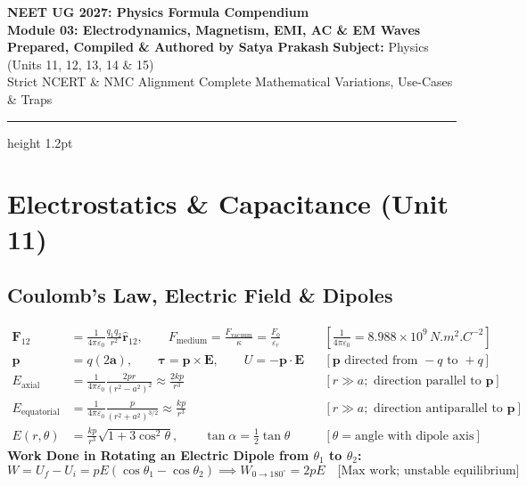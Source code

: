 \documentclass[11pt,a4paper]{article}
\begin{document}
\begin{center}
  {\huge\bfseries\color{primarydark} NEET UG 2027: Physics Formula Compendium}\\[6pt]
  {\Large\bfseries\color{accentblue} Module 03: Electrodynamics, Magnetism, EMI, AC \& EM Waves}\\[8pt]
  {\normalsize\textbf{Prepared, Compiled \& Authored by Satya Prakash} \quad\textbar\quad \textbf{Subject:} Physics (Units 11, 12, 13, 14 \& 15)}\\[4pt]
  {\footnotesize\color{gray} Strict NCERT \& NMC Alignment \quad\textbar\quad Complete Mathematical Variations, Use-Cases \& Traps}
\end{center}
\vspace{-2pt}
\hrule height 1.2pt
\vspace{8pt}

\section{Electrostatics \& Capacitance (Unit 11)}

\subsection{Coulomb's Law, Electric Field \& Dipoles}

\begin{formulabox}
\begin{align}
  \mathbf{F}_{12} &= \frac{1}{4\pi\varepsilon_0}\frac{q_1 q_2}{r^2}\hat{\mathbf{r}}_{12}, \qquad F_{\text{medium}} = \frac{F_{\text{vacuum}}}{\kappa} = \frac{F_0}{\varepsilon_r} && \left[\frac{1}{4\pi\varepsilon_0} = 8.988\times 10^9\,\si{N.m^2.C^{-2}}\right] \\
  \mathbf{p} &= q(2\mathbf{a}), \qquad \boldsymbol{\tau} = \mathbf{p}\times\mathbf{E}, \qquad U = -\mathbf{p}\cdot\mathbf{E} && [\mathbf{p} \text{ directed from } -q \text{ to } +q] \\
  E_{\text{axial}} &= \frac{1}{4\pi\varepsilon_0}\frac{2pr}{(r^2-a^2)^2} \approx \frac{2kp}{r^3} && [r \gg a; \text{ direction parallel to } \mathbf{p}] \\
  E_{\text{equatorial}} &= \frac{1}{4\pi\varepsilon_0}\frac{p}{(r^2+a^2)^{3/2}} \approx \frac{kp}{r^3} && [r \gg a; \text{ direction antiparallel to } \mathbf{p}] \\
  E(r,\theta) &= \frac{kp}{r^3}\sqrt{1 + 3\cos^2\theta}, \qquad \tan\alpha = \frac{1}{2}\tan\theta && [\theta = \text{angle with dipole axis}]
\end{align}
\textbf{Work Done in Rotating an Electric Dipole from $\theta_1$ to $\theta_2$:}
\begin{equation}
  W = U_f - U_i = pE(\cos\theta_1 - \cos\theta_2) \implies W_{0 \to 180^\circ} = 2pE \quad \text{[Max work; unstable equilibrium]}
\end{equation}
\end{formulabox}
\end{document}
